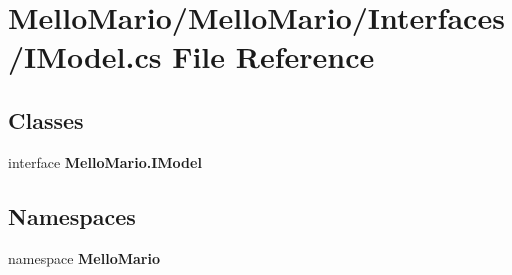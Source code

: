 \section{Mello\+Mario/\+Mello\+Mario/\+Interfaces/\+I\+Model.cs File Reference}
\label{IModel_8cs}
\subsection*{Classes}
\begin{DoxyCompactItemize}
\item 
interface \textbf{ Mello\+Mario.\+I\+Model}
\end{DoxyCompactItemize}
\subsection*{Namespaces}
\begin{DoxyCompactItemize}
\item 
namespace \textbf{ Mello\+Mario}
\end{DoxyCompactItemize}

